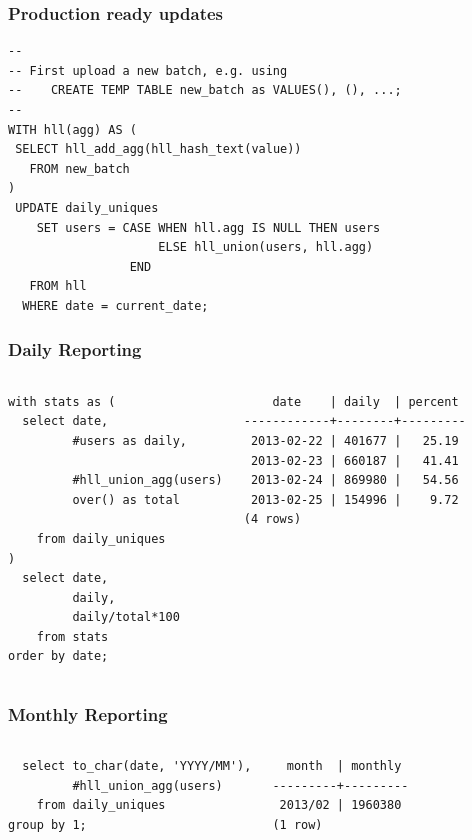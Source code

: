 \documentclass{beamer}
\begin{document}
\begin{frame}[fragile]
  \frametitle{Production ready updates}

\begin{verbatim}
--
-- First upload a new batch, e.g. using
--    CREATE TEMP TABLE new_batch as VALUES(), (), ...;
--
WITH hll(agg) AS (
 SELECT hll_add_agg(hll_hash_text(value))
   FROM new_batch
)
 UPDATE daily_uniques
    SET users = CASE WHEN hll.agg IS NULL THEN users
                     ELSE hll_union(users, hll.agg)
                 END
   FROM hll
  WHERE date = current_date;
\end{verbatim}  
\end{frame}

\begin{frame}[fragile]
  \frametitle{Daily Reporting}

\begin{columns}
\begin{verbatim}
with stats as (
  select date,
         #users as daily,

         #hll_union_agg(users)
         over() as total

    from daily_uniques
)
  select date,
         daily,
         daily/total*100
    from stats
order by date;
\end{verbatim}  
\begin{verbatim}
    date    | daily  | percent 
------------+--------+---------
 2013-02-22 | 401677 |   25.19
 2013-02-23 | 660187 |   41.41
 2013-02-24 | 869980 |   54.56
 2013-02-25 | 154996 |    9.72
(4 rows)
\end{verbatim}  
\end{columns}
\end{frame}

\begin{frame}[fragile]
  \frametitle{Monthly Reporting}

\begin{columns}
\begin{verbatim}
  select to_char(date, 'YYYY/MM'),
         #hll_union_agg(users)
    from daily_uniques
group by 1;
\end{verbatim}  
\begin{verbatim}     
  month  | monthly 
---------+---------
 2013/02 | 1960380
(1 row)
\end{verbatim}  
\end{columns}
\end{frame}
\end{document}
